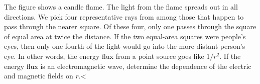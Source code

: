 The figure shows a candle flame.  The light from
the flame spreads out in all directions. We pick four representative
rays from among those that happen to pass through the nearer square.
Of these four, only one passes through the square of equal area at
twice the distance. If the two equal-area squares were people's eyes,
then only one fourth of the light would go into the more distant
person's eye. In other words, the energy flux from a point source goes
like $1/r^2$. If the energy flux is an electromagnetic wave, determine
the dependence of the electric and magnetic fields on $r$.<%
